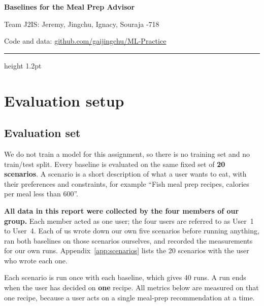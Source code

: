 \documentclass[11pt]{article}
\begin{document}
\thispagestyle{plain}

{\sffamily\bfseries\fontsize{22}{26}\selectfont Baselines for the Meal Prep Advisor\par}
\vspace{5pt}
{\sffamily\color{muted}Team J2IS: Jeremy, Jingchu, Ignacy, Souraja \quad\textperiodcentered{}-718\par}
\vspace{2pt}
{\sffamily\small\color{muted}Code and data: \href{https://github.com/gaijingchu/ML-Practice}{\color{accent}github.com/gaijingchu/ML-Practice}\par}
\vspace{7pt}
{\color{accent}\hrule height 1.2pt}
\vspace{2pt}

\setcounter{section}{1}

\section{Evaluation setup}

\subsection{Evaluation set}

We do not train a model for this assignment, so there is no training set and no train/test split.
Every baseline is evaluated on the same fixed set of \textbf{20 scenarios}.
A scenario is a short description of what a user wants to eat, with their preferences and constraints, for example
``Fish meal prep recipes, calories per meal less than 600''.

\textbf{All data in this report were collected by the four members of our group.}
Each member acted as one user; the four users are referred to as User~1 to User~4.
Each of us wrote down our own five scenarios before running anything,
ran both baselines on those scenarios ourselves, and recorded the measurements for our own runs.
Appendix~\ref{app:scenarios} lists the 20 scenarios with the user who wrote each one.

Each scenario is run once with each baseline, which gives 40 runs.
A run ends when the user has decided on \textbf{one} recipe.
All metrics below are measured on that one recipe, because a user acts on a single meal-prep recommendation at a time.
\end{document}
